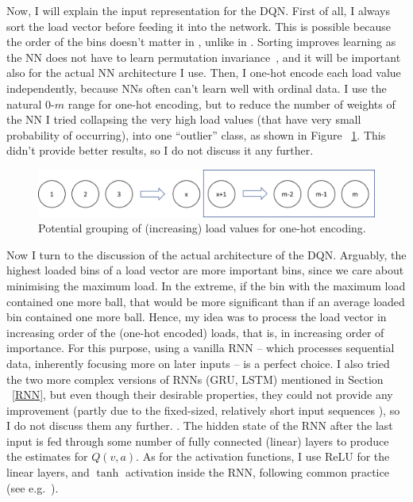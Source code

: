 Now, I will explain the input representation for the DQN. First of all, I always sort the load vector before feeding it into the network. This is possible because the order of the bins doesn't matter in \TwoThinning, unlike in \GraphicalTwoChoice. Sorting improves learning as the NN does not have to learn permutation invariance~\cite{zaheer2017permutationinvariance}, and it will be important also for the actual NN architecture I use. Then, I one-hot encode each load value independently, because NNs often can't learn well with ordinal data. I use the natural $0$-$m$ range for one-hot encoding, but to reduce the number of weights of the NN I tried collapsing the very high load values (that have very small probability of occurring), into one ``outlier'' class, as shown in Figure ~\ref{NN-maxload}. This didn't provide better results, so I do not discuss it any further.


\begin{figure}[hbt!] \label{NN-maxload}
    \centering
    \includegraphics[scale=0.5]{Chapter2/Figs/NN_maxload.png}
    \caption{Potential grouping of (increasing) load values for one-hot encoding.}
\end{figure}


Now I turn to the discussion of the actual architecture of the DQN. Arguably, the highest loaded bins of a load vector are more important bins, since we care about minimising the maximum load. In the extreme, if the bin with the maximum load contained one more ball, that would be more significant than if an average loaded bin contained one more ball. Hence, my idea was to process the load vector in increasing order of the (one-hot encoded) loads, that is, in increasing order of importance. For this purpose, using a vanilla RNN -- which processes sequential data, inherently focusing more on later inputs -- is a perfect choice. I also tried the two more complex versions of RNNs (GRU, LSTM) mentioned in Section ~\ref{RNN}, but even though their desirable properties, they could not provide any improvement (partly due to the fixed-sized, relatively short input sequences ), so I do not discuss them any further. .
The hidden state of the RNN after the last input is fed through some number of fully connected (linear) layers to produce the estimates for $Q(v, a)$. As for the activation functions, I use ReLU for the linear layers, and $\tanh$ activation inside the RNN, following common practice (see e.g.~\cite{szandala2020activationfunctions}).


